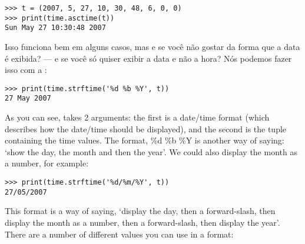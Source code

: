 \begin{listing}
\begin{verbatim}
>>> t = (2007, 5, 27, 10, 30, 48, 6, 0, 0)
>>> print(time.asctime(t))
Sun May 27 10:30:48 2007
\end{verbatim}
\end{listing}

\noindent
Isso funciona bem em alguns casos, mas e se você não gostar da forma que a data é exibida? --- e se você só quiser exibir a data e não a hora? Nós podemos fazer isso com a :

\begin{listing}
\begin{verbatim}
>>> print(time.strftime('%d %b %Y', t))
27 May 2007
\end{verbatim}
\end{listing}

As you can see,  takes 2 arguments:  the first is a date/time format (which describes how the date/time should be displayed), and the second is the tuple containing the time values.  The format, \%d \%b \%Y is another way of saying: `show the day, the month and then the year'.  We could also display the month as a number, for example:

\begin{listing}
\begin{verbatim}
>>> print(time.strftime('%d/%m/%Y', t))
27/05/2007
\end{verbatim}
\end{listing}

This format is a way of saying, `display the day, then a forward-slash, then display the month as a number, then a forward-slash, then display the year'.  There are a number of different values you can use in a format:

